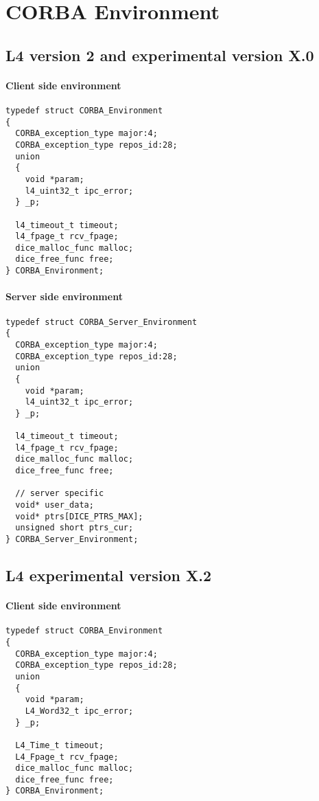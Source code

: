 \chapter{CORBA Environment}
\label{app:corba_env}

\section{L4 version 2 and experimental version X.0}

\subsubsection{Client side environment}
\begin{verbatim}
typedef struct CORBA_Environment
{
  CORBA_exception_type major:4;
  CORBA_exception_type repos_id:28;
  union
  {
    void *param;
    l4_uint32_t ipc_error;
  } _p;

  l4_timeout_t timeout;
  l4_fpage_t rcv_fpage;
  dice_malloc_func malloc;
  dice_free_func free;
} CORBA_Environment;
\end{verbatim}

\subsubsection{Server side environment}
\begin{verbatim}
typedef struct CORBA_Server_Environment
{
  CORBA_exception_type major:4;
  CORBA_exception_type repos_id:28;
  union
  {
    void *param;
    l4_uint32_t ipc_error;
  } _p;

  l4_timeout_t timeout;
  l4_fpage_t rcv_fpage;
  dice_malloc_func malloc;
  dice_free_func free;
  
  // server specific
  void* user_data;
  void* ptrs[DICE_PTRS_MAX];
  unsigned short ptrs_cur;
} CORBA_Server_Environment;
\end{verbatim}

\section{L4 experimental version X.2}

\subsubsection{Client side environment}
\begin{verbatim}
typedef struct CORBA_Environment
{
  CORBA_exception_type major:4;
  CORBA_exception_type repos_id:28;
  union          
  {
    void *param;
    L4_Word32_t ipc_error;
  } _p;
  
  L4_Time_t timeout;
  L4_Fpage_t rcv_fpage;
  dice_malloc_func malloc;
  dice_free_func free;
} CORBA_Environment;
\end{verbatim}

